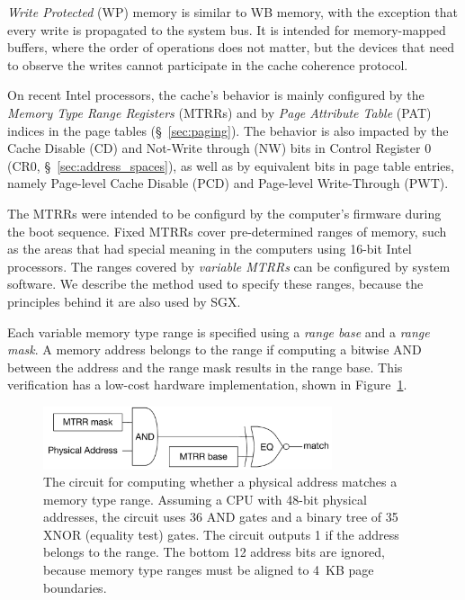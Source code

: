 \textit{Write Protected} (WP) memory is similar to WB memory, with the
exception that every write is propagated to the system bus. It is intended for
memory-mapped buffers, where the order of operations does not matter, but the
devices that need to observe the writes cannot participate in the cache
coherence protocol.


On recent Intel processors, the cache's behavior is mainly configured by the
\textit{Memory Type Range Registers} (MTRRs) and by
\textit{Page Attribute Table} (PAT) indices in the page tables
(\S~\ref{sec:paging}). The behavior is also impacted by the Cache Disable (CD)
and Not-Write through (NW) bits in Control Register 0
(CR0, \S~\ref{sec:address_spaces}), as well as by equivalent bits in page table
entries, namely Page-level Cache Disable (PCD) and Page-level Write-Through
(PWT).

The MTRRs were intended to be configurd by the computer's firmware during the
boot sequence. Fixed MTRRs cover pre-determined ranges of memory, such as the
areas that had special meaning in the computers using 16-bit Intel processors.
The ranges covered by \textit{variable MTRRs} can be configured by system
software. We describe the method used to specify these ranges, because the
principles behind it are also used by SGX.


Each variable memory type range is specified using a \textit{range base} and a
\textit{range mask}. A memory address belongs to the range if computing a
bitwise AND between the address and the range mask results in the range base.
This verification has a low-cost hardware implementation, shown in
Figure~\ref{fig:mtrr_match}.

\begin{figure}[hbt]
  \centering
  \includegraphics[width=85mm]{figures/mtrr_match.pdf}
  \caption{
    The circuit for computing whether a physical address matches a memory type
    range.  Assuming a CPU with 48-bit physical addresses, the circuit uses 36
    AND gates and a binary tree of 35 XNOR (equality test) gates. The circuit
    outputs 1 if the address belongs to the range. The bottom 12 address
    bits are ignored, because memory type ranges must be aligned to 4~KB page
    boundaries.
  }
  \label{fig:mtrr_match}
\end{figure}

